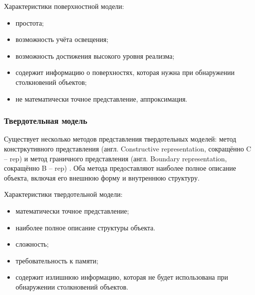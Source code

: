 Характеристики поверхностной модели:
\begin{itemize}
    \item простота;
    \item возможность учёта освещения;
    \item возможность достижения высокого уровня реализма;
    \item содержит информацию о поверхностях, которая нужна при обнаружении столкновений объектов;
    \item не математически точное представление, аппроксимация.
\end{itemize}


\subsubsection{Твердотельная модель}

Существует несколько методов представления твердотельных моделей: метод констркутивного представления (англ. Constructive representation, сокращённо C -- rep) и метод граничного представления (англ. Boundary representation, сокращённо B -- rep) \cite{m3m, msbm}. %
Оба метода предоставляют наиболее полное описание объекта, включая его внешнюю форму и внутреннюю структуру.

Характеристики твердотельной модели:
\begin{itemize}
    \item математически точное представление;
    \item наиболее полное описание структуры объекта.
    \item сложность;
    \item требовательность к памяти;
    \item содержит излишнюю информацию, которая не будет использована при обнаружении столкновений объектов.
\end{itemize}


